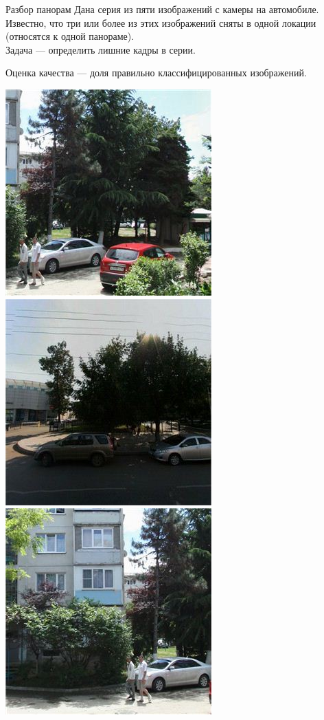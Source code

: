 \documentclass[14pt,mathserif,aspectratio=43]{beamer}
\begin{document}
\begin{frame}{Разбор панорам}
    Дана серия из пяти изображений с камеры на автомобиле. \\
    Известно, что три или более из этих изображений сняты в одной локации (относятся к одной панораме). \\
    Задача --- определить лишние кадры в серии. \\
    
    \bigskip

    Оценка качества --- доля правильно классифицированных изображений. \\

	\bigskip

    \includegraphics[scale=0.25]{1_1.jpg}
    \includegraphics[scale=0.25]{1_2.jpg}
	\includegraphics[scale=0.25]{1_3.jpg}

\end{frame}
\end{document}
